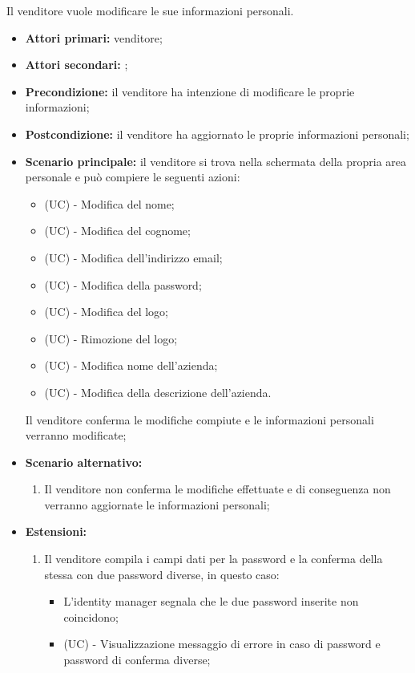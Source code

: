 Il venditore vuole modificare le sue informazioni personali.
\begin{itemize}
    \item \textbf{Attori primari:} venditore;
    \item \textbf{Attori secondari:} ;
    \item \textbf{Precondizione:} il venditore ha intenzione di modificare le proprie informazioni;
    \item \textbf{Postcondizione:} il venditore ha aggiornato le proprie informazioni personali;
    \item \textbf{Scenario principale:} il venditore si trova nella schermata della propria area personale e può compiere le seguenti azioni:
    \begin{itemize}
    	\item (UC) - Modifica del nome;
    	\item (UC) - Modifica del cognome;
        \item (UC) - Modifica dell'indirizzo email;
        \item (UC) - Modifica della password;
        \item (UC) - Modifica del logo;
        \item (UC) - Rimozione del logo;
        \item (UC) - Modifica nome dell'azienda;
        \item (UC) - Modifica della descrizione dell'azienda.
    \end{itemize}
    Il venditore conferma le modifiche compiute e le informazioni personali verranno modificate;
    \item \textbf{Scenario alternativo:}
    \begin{enumerate}[label=\lett]
    	\item Il venditore non conferma le modifiche effettuate e di conseguenza non verranno aggiornate le informazioni personali;
    \end{enumerate}
    \item \textbf{Estensioni:}
    \begin{enumerate}[label=\lett]
    	\item Il venditore compila i campi dati per la password e la conferma della stessa con due password diverse, in questo caso:
    	\begin{itemize}
    		\item L'identity manager segnala che le due password inserite non coincidono;
    		\item (UC) - Visualizzazione messaggio di errore in caso di password e password di conferma diverse;

\end{itemize}
\end{enumerate}
\end{itemize}
